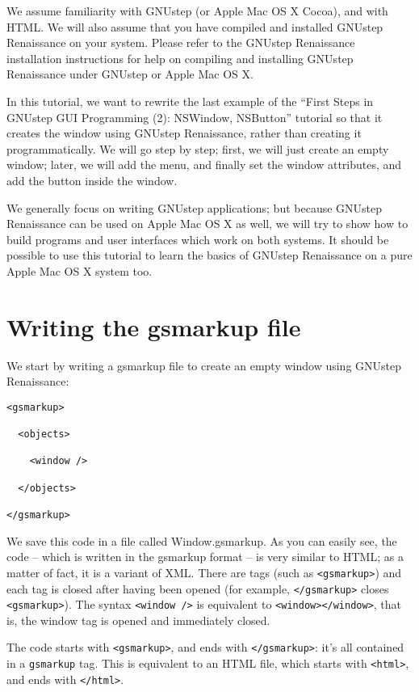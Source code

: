 \documentclass[a4paper]{article}
\begin{document}
We assume familiarity with GNUstep (or Apple Mac OS X Cocoa), and with
HTML.  We will also assume that you have compiled and installed
GNUstep Renaissance on your system.  Please refer to the GNUstep
Renaissance installation instructions for help on compiling and
installing GNUstep Renaissance under GNUstep or Apple Mac OS X.

In this tutorial, we want to rewrite the last example of the ``First
Steps in GNUstep GUI Programming (2): NSWindow, NSButton'' tutorial so
that it creates the window using GNUstep Renaissance, rather than
creating it programmatically.  We will go step by step; first, we will
just create an empty window; later, we will add the menu, and finally
set the window attributes, and add the button inside the window.

We generally focus on writing GNUstep applications; but because
GNUstep Renaissance can be used on Apple Mac OS X as well, we will try
to show how to build programs and user interfaces which work on both
systems.  It should be possible to use this tutorial to learn the
basics of GNUstep Renaissance on a pure Apple Mac OS X system too.

\section{Writing the gsmarkup file}
We start by writing a gsmarkup file to create an empty window using
GNUstep Renaissance:
\begin{verbatim}
<gsmarkup>

  <objects>

    <window />

  </objects>

</gsmarkup>
\end{verbatim}
We save this code in a file called Window.gsmarkup.  As you can easily
see, the code -- which is written in the gsmarkup format -- is very
similar to HTML; as a matter of fact, it is a variant of XML.  There
are tags (such as \texttt{<gsmarkup>}) and each tag is closed after
having been opened (for example, \texttt{</gsmarkup>} closes
\texttt{<gsmarkup>}).  The syntax \texttt{<window />} is equivalent to
\texttt{<window></window>}, that is, the window tag is opened and
immediately closed.

The code starts with \texttt{<gsmarkup>}, and ends with
\texttt{</gsmarkup>}: it's all contained in a \texttt{gsmarkup} tag.
This is equivalent to an HTML file, which starts with \texttt{<html>},
and ends with \texttt{</html>}.
\end{document}
